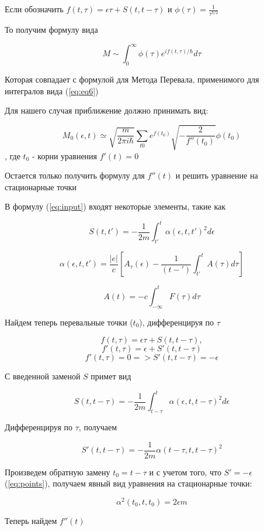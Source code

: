 \documentclass[14pt]{extarticle}
\begin{document}
Если обозначить
$
f(t, \tau) = \epsilon \tau + S(t, t-\tau) 
$ и
$
\phi(\tau) = \frac{1}{{\tau}^{3/2}} 
$

То получим формулу вида

$$
M \sim \int_{0}^{\infty} \phi(\tau) e^{i f(t, \tau)/\hbar} d\tau
$$

Которая совпадает с формулой для Метода Перевала, применимого для интегралов вида (\ref{eq:eq6})

Для нашего случая приближение должно принимать вид:

$$
M_0(\epsilon, t) \simeq \sqrt{\frac{m}{2\pi i \hbar}}\sum_{t0}e^{f(t_0)} \sqrt{-\frac{2}{f''(t_0)}} \phi(t_0)
$$, где $t_0$ - корни уравнения $f'(t) = 0$

Остается только получить формулу для $f''(t)$ и решить уравнение на стационарные точки 

В формулу (\ref{eq:input}) входят некоторые элементы, такие как

$$
S(t, t') = -\frac{1}{2m}\int_{t'}^{t} \alpha(\epsilon, t, t')^2 d\epsilon
$$

$$
\alpha(\epsilon, t, t') = \frac{|e|}{c} [A_{\tau}(\epsilon) - \frac{1}{(t-')}\int_{t'}^{t}A(\tau) d\tau]
$$

$$
A(t) = -c\int_{-\infty}^{t} F(\tau) d\tau
$$

Найдем теперь перевальные точки ($t_0$), дифференцируя по $\tau$

$$
f(t, \tau) = \epsilon \tau + S(t, t-\tau),
$$
$$
f'(t, \tau) = \epsilon + S'(t, t-\tau)
$$
\begin{equation}\label{eq:points}
	f'(t, \tau)=0 => S'(t, t-\tau) = -\epsilon
\end{equation}

С введенной заменой $S$ примет вид

$$
S(t, t-\tau) = -\frac{1}{2m}\int_{t-\tau}^{t} \alpha(\epsilon, t, t-\tau)^2 d\epsilon
$$

Дифференцируя по $\tau$, получаем

$$
S'(t, t-\tau) = -\frac{1}{2m} \alpha(t-\tau, t, t-\tau)^2
$$

Произведем обратную замену $t_0 = t-\tau$ и с учетом того, что $S' = -\epsilon$ (\ref{eq:points}), получаем явный вид уравнения на стационарные точки:

\begin{equation}\label{eq:solvepoints}
\alpha ^2 (t_0, t, t_0) = 2 \epsilon m
\end{equation}

Теперь найдем $f''(t)$
\end{document}
